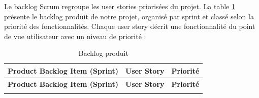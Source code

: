Le backlog Scrum regroupe les user stories priorisées du projet. 
\newline 
 La table \ref{tab:product-backlog} présente le backlog produit de notre projet, organisé par sprint et classé selon la priorité des fonctionnalités. Chaque user story décrit une fonctionnalité du point de vue utilisateur avec un niveau de priorité : 
\begin{longtable}{|p{4cm}|p{9.5cm}|p{2cm}|}
\caption{Backlog produit}
\label{tab:product-backlog}\\
\hline
\rowcolor{coloranihub}
\textbf{Product Backlog Item (Sprint)} & \textbf{User Story} & \textbf{Priorité} \\
\hline
\endfirsthead

\hline
\rowcolor{coloranihub}
\textbf{Product Backlog Item (Sprint)} & \textbf{User Story} & \textbf{Priorité} \\
\hline
\endhead

\hline
\endfoot


\end{longtable}
